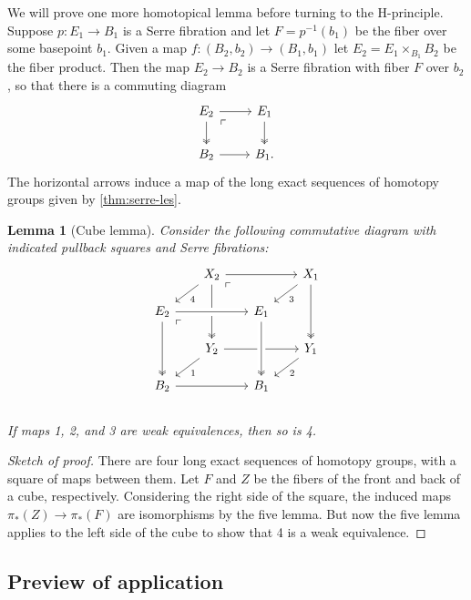 \documentclass{article}
\newtheorem{lemma}[theorem]{Lemma}
\newtheorem{proposed work}[theorem]{Proposed Work}
\theoremstyle{definition}
\begin{document}
We will prove one more homotopical lemma before turning to the
H-principle. Suppose $p: E_1\to B_1$ is a Serre fibration and let
$F = p^{-1}(b_1)$ be the fiber over some basepoint $b_1$. Given a map
$f: (B_2,b_2) \to (B_1,b_1)$ let $E_2 = E_1\times_{B_1} B_2$ be the
fiber product. Then the map $E_2 \to B_2$ is a Serre fibration with
fiber $F$ over $b_2$, so that there is a commuting diagram
\[
\begin{tikzcd}
E_2 \arrow[r] \arrow[d,two heads] \arrow[dr, phantom, "\ulcorner", very near start]
& E_1 \arrow[d, two heads] 
\\
B_2 \arrow[r]
& B_1.
\end{tikzcd}
\]
The horizontal arrows induce a map of the long exact sequences of
homotopy groups given by \ref{thm:serre-les}.

\begin{lemma}[Cube lemma] Consider the following commutative diagram with
  indicated pullback squares and Serre fibrations:
  \[
    \begin{tikzcd}[row sep=scriptsize, column sep=scriptsize]
      & X_2 \arrow[dl,"4"] \arrow[rr] \arrow[dd, two heads] \arrow[dr,
      phantom, "\ulcorner", very near start] & & X_1 \arrow[dl,"3"]
      \arrow[dd, two heads] \\
      E_2 \arrow[rr, crossing over] \arrow[dd, two heads] \arrow[dr,
      phantom, "\ulcorner", very near start] & & E_1 \\
      & Y_2 \arrow[dl,"1"] \arrow[rr] & & Y_1 \arrow[dl,"2"] \\
      B_2 \arrow[rr] & & B_1 \arrow[from=uu, crossing over, two heads]\\
    \end{tikzcd}
  \]
  If maps 1, 2, and 3 are weak equivalences, then so is 4.
\end{lemma}

\begin{proof}[Sketch of proof]
  There are four long exact sequences of homotopy groups, with a
  square of maps between them. Let $F$ and $Z$ be the fibers of the
  front and back of a cube, respectively. Considering the right side
  of the square, the induced maps $\pi_*(Z)\to \pi_*(F)$ are
  isomorphisms by the five lemma. But now the five lemma applies to
  the left side of the cube to show that 4 is a weak equivalence.
\end{proof}

\subsection{Preview of application}
\end{document}
